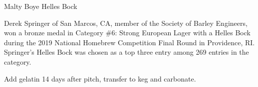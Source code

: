 \stylesection{\stylemaibock}

\begin{recipie}{Malty Boye Helles Bock}

\begin{aboutblock}
Derek Springer of San Marcos, CA, member of the Society of Barley Engineers, won a
bronze medal in Category \#6: Strong European Lager with a Helles Bock during the 2019
National Homebrew Competition Final Round in Providence, RI. Springer's Helles Bock was
chosen as a top three entry among 269 entries in the category.
\end{aboutblock}


\begin{methodandtiming}
 
\begin{mashsteps}
\end{mashsteps}

\begin{fermentationsteps}
\end{fermentationsteps}

\begin{directions}
Add gelatin 14 days after pitch, transfer to keg and carbonate.
\end{directions}

\end{methodandtiming}

\pagebreak

\begin{ingredientsblock}

\begin{malts}
\end{malts}

\begin{hops}
\end{hops}

\begin{yeasts}
\end{yeasts}

\end{ingredientsblock}

\end{recipie}
